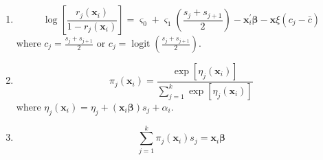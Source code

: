 \begin{enumerate}
    \item \begin{equation}
              \log\left[\frac{r_{j}\left(\mathbf{x}_{i}\right)}{1-r_{j}\left(\mathbf{x}_{i}\right)}\right]=\varsigma_{0}+\varsigma_{1}\left(\frac{s_{j}+s_{j+1}}{2}\right)-\mathbf{x}_{i}^{\prime}\boldsymbol{\beta}-\mathbf{x}\xi\left(c_{j}-\bar{c}\right)
          \end{equation}
          where $c_{j}=\frac{s_{j}+s_{j+1}}{2}$ or $c_{j}=\operatorname{logit}\left(\frac{s_{j}+s_{j+1}}{2}\right)$.
    \item \begin{equation}
              \pi_{j}\left(\mathbf{x}_{i}\right)=\frac{\exp \left[\eta_{j}\left(\mathbf{x}_{i}\right)\right]}{\sum_{j=1}^{k} \exp \left[\eta_{j}\left(\mathbf{x}_{i}\right)\right]}
          \end{equation}
          where $\eta_{j}\left(\mathbf{x}_{i}\right)=\eta_{j}+\left(\mathbf{x}_{i}\boldsymbol{\beta}\right)s_{j}+\alpha_{i}$.
    \item \begin{equation}
        \sum_{j=1}^{k}\pi_{j}\left(\mathbf{x}_{i}\right)s_{j}=\mathbf{x}_{i}\boldsymbol{\beta}
    \end{equation}
\end{enumerate}